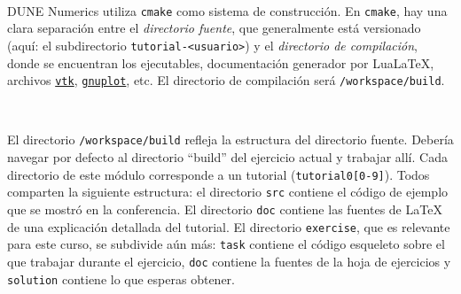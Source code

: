 \documentclass[9pt,a3paper]{scrartcl}
\begin{document}
\

DUNE Numerics utiliza \verb!cmake! como sistema de construcción.
En \verb!cmake!, hay una clara separación entre el
\textit{directorio fuente}, que generalmente está versionado
(aquí: el subdirectorio \verb!tutorial-<usuario>!) y el
\textit{directorio de compilación}, donde se encuentran los
ejecutables, documentación generador por Lua\LaTeX{}, archivos
\href {https://vtk.org}{\texttt{vtk}},
\href{http://www.gnuplot.info}{\texttt{gnuplot}}, etc.
El directorio de compilación será \verb!/workspace/build!.

\

El directorio \verb!/workspace/build! refleja la estructura del directorio
fuente.
Debería navegar por defecto al directorio ``build'' del ejercicio
actual y trabajar allí.
Cada directorio de este módulo corresponde a un tutorial
(\verb!tutorial0[0-9]!).
Todos comparten la siguiente estructura: el directorio \verb!src!
contiene el código de ejemplo que se mostró en la conferencia.
El directorio \verb!doc! contiene las fuentes de \LaTeX{} de una
explicación detallada del tutorial.
El directorio \verb!exercise!, que es relevante para este curso, se
subdivide aún más: \verb!task! contiene el código esqueleto sobre el
que trabajar durante el ejercicio, \verb!doc! contiene la fuentes de
la hoja de ejercicios y \verb!solution! contiene lo que esperas
obtener.

\
\end{document}

